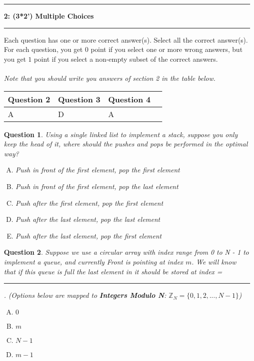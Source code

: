 \documentclass[10.5pt]{article}
\newcommand\question[2]{\vspace{.25in}\hrule\textbf{#1: #2}\vspace{.5em}
\hrule\vspace{.10in}}
\newtheorem{Q}{Question}
\begin{document}
	\pagebreak

	
\question{2}{(3*2') Multiple Choices}

Each question has one or more correct answer(s). Select all the correct answer(s). For each question, you get $0$ point if you select one or more wrong answers, but you get $1$ point if you select a non-empty subset of the correct answers.\\ \\
\textit{Note that you should write you answers of section 2 in the table below.}
\begin{table}[htbp]
	\begin{tabular}{|p{2cm}|p{2cm}|p{2cm}|p{2cm}|}
		\hline 
	Question 2 & Question 3 & Question 4  \\ 
		\hline 
	 A & D & A \\ 
		\hline 
	\end{tabular} 
\end{table}

\begin{Q}
	Using a single linked list to implement a stack, suppose you only keep the head of it, where should the pushes and pops be performed in the optimal way?
	\begin{enumerate}[(A)]
		\item Push in front of the first element, pop the first element
		\item Push in front of the first element, pop the last element
		\item Push after the first element, pop the first element
		\item Push after the last element, pop the last element
		\item Push after the last element, pop the first element
	\end{enumerate}
\end{Q}

\begin{Q}
 Suppose we use a circular array with index range from 0 to N - 1 to implement a queue, and currently Front is pointing at index $m$. We will know that if this queue is full the last element in it should be stored at index = \rule[-3pt]{1cm}{0.05em}. (Options below are mapped to \textbf{Integers Modulo N}: $\mathbb{Z}_N = \{0, 1, 2, ..., N-1\}$)
	\begin{enumerate}[(A)]
		\item $0$
		\item $m$
		\item $N-1$
		\item $m-1$
	\end{enumerate}
\end{Q}
\end{document}
